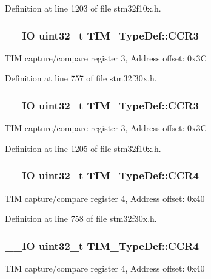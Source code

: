 Definition at line 1203 of file stm32f10x.\-h.

\hypertarget{struct_t_i_m___type_def_ac83441bfb8d0287080dcbd945a272a74}{
\subsubsection[{C\-C\-R3}]{\setlength{\rightskip}{0pt plus 5cm}\-\_\-\-\_\-\-I\-O {\bf uint32\-\_\-t} T\-I\-M\-\_\-\-Type\-Def\-::\-C\-C\-R3}}\label{struct_t_i_m___type_def_ac83441bfb8d0287080dcbd945a272a74}
T\-I\-M capture/compare register 3, Address offset\-: 0x3\-C 

Definition at line 757 of file stm32f30x.\-h.

\hypertarget{struct_t_i_m___type_def_ac83441bfb8d0287080dcbd945a272a74}{
\subsubsection[{C\-C\-R3}]{\setlength{\rightskip}{0pt plus 5cm}\-\_\-\-\_\-\-I\-O {\bf uint32\-\_\-t} T\-I\-M\-\_\-\-Type\-Def\-::\-C\-C\-R3}}\label{struct_t_i_m___type_def_ac83441bfb8d0287080dcbd945a272a74}
T\-I\-M capture/compare register 3, Address offset\-: 0x3\-C 

Definition at line 1205 of file stm32f10x.\-h.

\hypertarget{struct_t_i_m___type_def_a5ba381c3f312fdf5e0b4119641b3b0aa}{
\subsubsection[{C\-C\-R4}]{\setlength{\rightskip}{0pt plus 5cm}\-\_\-\-\_\-\-I\-O {\bf uint32\-\_\-t} T\-I\-M\-\_\-\-Type\-Def\-::\-C\-C\-R4}}\label{struct_t_i_m___type_def_a5ba381c3f312fdf5e0b4119641b3b0aa}
T\-I\-M capture/compare register 4, Address offset\-: 0x40 

Definition at line 758 of file stm32f30x.\-h.

\hypertarget{struct_t_i_m___type_def_a5ba381c3f312fdf5e0b4119641b3b0aa}{
\subsubsection[{C\-C\-R4}]{\setlength{\rightskip}{0pt plus 5cm}\-\_\-\-\_\-\-I\-O {\bf uint32\-\_\-t} T\-I\-M\-\_\-\-Type\-Def\-::\-C\-C\-R4}}\label{struct_t_i_m___type_def_a5ba381c3f312fdf5e0b4119641b3b0aa}
T\-I\-M capture/compare register 4, Address offset\-: 0x40 

